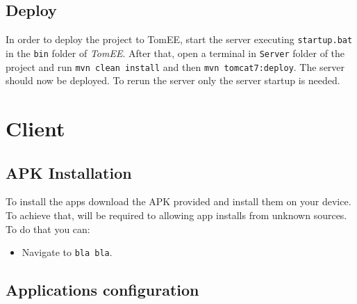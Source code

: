 \subsection{Deploy}
In order to deploy the project to TomEE, start the server executing \verb|startup.bat| in the \verb|bin| folder of \textit{TomEE}.\newline
After that, open a terminal in \verb|Server| folder of the project and run \verb|mvn clean install| and then \verb|mvn tomcat7:deploy|.\newline
The server should now be deployed. To rerun the server only the server startup is needed.

\clearpage

\section{Client}
\subsection{APK Installation}
To install the apps download the APK provided and install them on your device. To achieve that, will be required to allowing app installs from unknown sources. To do that you can:
\begin{itemize}
	\item Navigate to \verb|bla bla|.
\end{itemize}
\subsection{Applications configuration}
